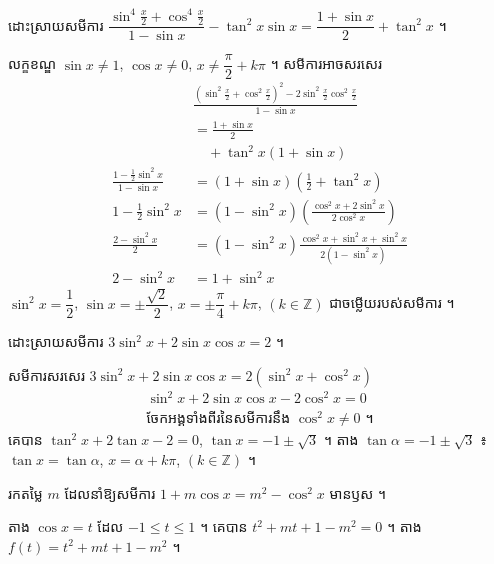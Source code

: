 \begin{example}[ឧទាហរណ៍ ២]
ដោះស្រាយសមីការ $\dfrac{\sin^4\frac{x}{2} + \cos^4\frac{x}{2}}{1 - \sin x} - \tan^2 x\sin x = \dfrac{1 + \sin x}{2} + \tan^2 x$ ។

លក្ខខណ្ឌ $\sin x \ne 1$, $\cos x \ne 0$, $x \ne \dfrac{\pi}{2} + k\pi$ ។ សមីការអាចសរសេរ
\[
\begin{aligned}
&\frac{\left(\sin^2\frac{x}{2} + \cos^2\frac{x}{2}\right)^2 - 2\sin^2\frac{x}{2}\cos^2\frac{x}{2}}{1 - \sin x}\\
&= \frac{1 + \sin x}{2}\\
&\quad + \tan^2 x(1 + \sin x)\\
\frac{1 - \frac{1}{2}\sin^2 x}{1 - \sin x} &= (1 + \sin x)\left(\frac{1}{2} + \tan^2 x\right)\\
1 - \frac{1}{2}\sin^2 x &= (1 - \sin^2 x)\left(\frac{\cos^2 x + 2\sin^2 x}{2\cos^2 x}\right)\\
\frac{2 - \sin^2 x}{2} &= (1 - \sin^2 x)\frac{\cos^2 x + \sin^2 x + \sin^2 x}{2(1 - \sin^2 x)}\\
2 - \sin^2 x &= 1 + \sin^2 x
\end{aligned}
\]
$\sin^2 x = \dfrac{1}{2}$, $\sin x = \pm\dfrac{\sqrt{2}}{2}$, $x = \pm\dfrac{\pi}{4} + k\pi$, $(k \in \mathbb{Z})$ ជាចម្លើយរបស់សមីការ ។
\end{example}

\begin{example}[លំហាត់គំរូ ៣]
ដោះស្រាយសមីការ $3\sin^2 x + 2\sin x\cos x = 2$ ។
\end{example}
\ans
សមីការសរសេរ $3\sin^2 x + 2\sin x\cos x = 2(\sin^2 x + \cos^2 x)$
\[
\begin{gathered}
\sin^2 x + 2\sin x\cos x - 2\cos^2 x = 0\\
\text{ចែកអង្គទាំងពីរនៃសមីការនឹង } \cos^2 x \ne 0 \text{ ។}
\end{gathered}
\]
គេបាន $\tan^2 x + 2\tan x - 2 = 0$, $\tan x = -1 \pm \sqrt{3}$ ។ តាង $\tan\alpha = -1 \pm \sqrt{3}$ ៖ $\tan x = \tan\alpha$, $x = \alpha + k\pi$, $(k \in \mathbb{Z})$ ។

\begin{example}[លំហាត់គំរូ ៤]
រកតម្លៃ $m$ ដែលនាំឱ្យសមីការ $1 + m\cos x = m^2 - \cos^2 x$ មានឫស ។
\end{example}
\ans
តាង $\cos x = t$ ដែល $-1 \le t \le 1$ ។ គេបាន $t^2 + mt + 1 - m^2 = 0$ ។ តាង $f(t) = t^2 + mt + 1 - m^2$ ។

